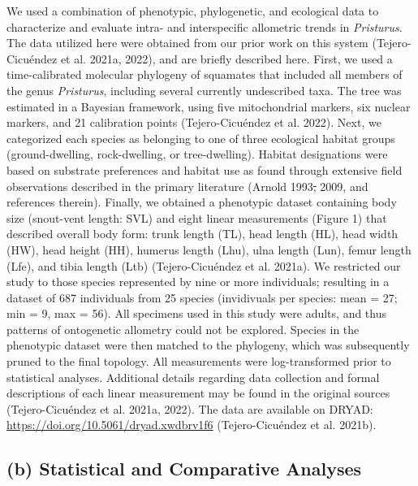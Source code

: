 \documentclass[
  11pt,
]{article}
\providecommand{\DIFaddtex}[1]{{\protect\color{blue}\uwave{#1}}} %
\providecommand{\DIFdeltex}[1]{{\protect\color{red}\sout{#1}}}                      %
\providecommand{\DIFaddbegin}{} %
\providecommand{\DIFaddend}{} %
\providecommand{\DIFdelbegin}{} %
\providecommand{\DIFdelend}{} %
\providecommand{\DIFadd}[1]{\texorpdfstring{\DIFaddtex{#1}}{#1}} %
\providecommand{\DIFdel}[1]{\texorpdfstring{\DIFdeltex{#1}}{}} %
\newcommand{\DIFscaledelfig}{0.5}
\newlength{\DIFdelgraphicswidth} %
\newlength{\DIFdelgraphicsheight} %
\newcommand{\DIFaddincludegraphics}[2][]{{\color{blue}\fbox{\DIFOincludegraphics[#1]{#2}}}} %
\newcommand{\DIFdelincludegraphics}[2][]{%
\sbox{\DIFdelgraphicsbox}{\DIFOincludegraphics[#1]{#2}}%
\settoboxwidth{\DIFdelgraphicswidth}{\DIFdelgraphicsbox} %
\settoboxtotalheight{\DIFdelgraphicsheight}{\DIFdelgraphicsbox} %
\scalebox{\DIFscaledelfig}{%
\parbox[b]{\DIFdelgraphicswidth}{\usebox{\DIFdelgraphicsbox}\\[-\baselineskip] \rule{\DIFdelgraphicswidth}{0em}}\llap{\resizebox{\DIFdelgraphicswidth}{\DIFdelgraphicsheight}{%
\setlength{\unitlength}{\DIFdelgraphicswidth}%
\begin{picture}(1,1)%
\thicklines\linethickness{2pt} %
{\color[rgb]{1,0,0}\put(0,0){\framebox(1,1){}}}%
{\color[rgb]{1,0,0}\put(0,0){\line( 1,1){1}}}%
{\color[rgb]{1,0,0}\put(0,1){\line(1,-1){1}}}%
\end{picture}%
}\hspace*{3pt}}} %
} %
\DeclareRobustCommand{\DIFaddbegin}{\DIFOaddbegin \let\includegraphics\DIFaddincludegraphics} %
\DeclareRobustCommand{\DIFaddend}{\DIFOaddend \let\includegraphics\DIFOincludegraphics} %
\DeclareRobustCommand{\DIFdelbegin}{\DIFOdelbegin \let\includegraphics\DIFdelincludegraphics} %
\DeclareRobustCommand{\DIFdelend}{\DIFOaddend \let\includegraphics\DIFOincludegraphics} %
\begin{document}
We used a combination of phenotypic, phylogenetic, and ecological data
to characterize and evaluate intra- and interspecific allometric trends
in \emph{Pristurus}. The data utilized here were obtained from our prior
work on this system (Tejero-Cicuéndez et al. 2021a, 2022), and are
briefly described here. First, we used a time-calibrated molecular
phylogeny of squamates that included all members of the genus
\emph{Pristurus}, including several currently undescribed taxa. The tree
was estimated in a Bayesian framework, using five mitochondrial markers,
six nuclear markers, and 21 calibration points (Tejero-Cicuéndez et al.
2022). Next, we categorized each species as belonging to one of three
ecological habitat groups (ground-dwelling, rock-dwelling, or
tree-dwelling). Habitat designations were based on substrate preferences
and habitat use as found through extensive field observations described
in the primary literature (Arnold 1993\DIFdelbegin \DIFdel{, }\DIFdelend \DIFaddbegin \DIFadd{; Arnold }\DIFaddend 2009, and references
therein). Finally, we obtained a phenotypic dataset containing body size
(snout-vent length: SVL) and eight linear measurements (Figure 1) that
described overall body form: trunk length (TL), head length (HL), head
width (HW), head height (HH), humerus length (Lhu), ulna length (Lun),
femur length (Lfe), and tibia length (Ltb) (Tejero-Cicuéndez et al.
2021a). We restricted our study to those species represented by nine or
more individuals; resulting in a dataset of 687 individuals from 25
species (invidivuals per species: mean = 27; min = 9, max = 56). All
specimens used in this study were adults, and thus patterns of
ontogenetic allometry could not be explored. Species in the phenotypic
dataset were then matched to the phylogeny, which was subsequently
pruned to the final topology. All measurements were log-transformed
prior to statistical analyses. Additional details regarding data
collection and formal descriptions of each linear measurement may be
found in the original sources (Tejero-Cicuéndez et al. 2021a, 2022). The
data are available on DRYAD:
\url{https://doi.org/10.5061/dryad.xwdbrv1f6} (Tejero-Cicuéndez et al.
2021b).

\hypertarget{b-statistical-and-comparative-analyses}{%
\subsection{(b) Statistical and Comparative
Analyses}\label{b-statistical-and-comparative-analyses}}
\end{document}
